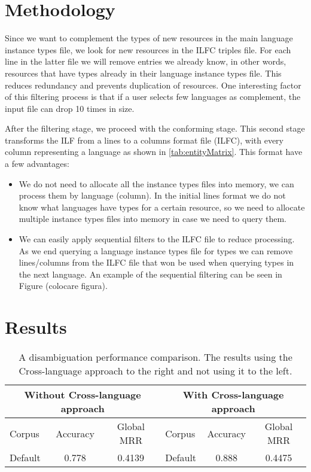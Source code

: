 \documentclass[10pt,a4paper]{llncs}
\begin{document}
\section{Methodology}

Since we want to complement the types of new resources in the main language instance types file, we look for new resources in the ILFC triples file. For each line in the latter file we will remove entries we already know, in other words, resources that have types already in their language instance types file. This reduces redundancy and prevents duplication of resources. One interesting factor of this filtering process is that if a user selects few languages as complement, the input file can drop 10 times in size.

After the filtering stage, we proceed with the conforming stage. This second stage transforms the ILF from a lines to a columns format file (ILFC), with every column representing a language as shown in \ref{tab:entityMatrix}. This format have a few advantages:

\begin{itemize}
	\item We do not need to allocate all the instance types files into memory, we can process them by language (column). In the initial lines format we do not know what languages have types for a certain resource, so we need to allocate multiple instance types files into memory in case we need to query them.
	\item We can easily apply sequential filters to the ILFC file to reduce processing. As we end querying a language instance types file for types we can remove lines/columns from the ILFC file that won be used when querying types in the next language. An example of the sequential filtering can be seen in Figure (colocare figura).
\end{itemize}

\section{Results}

\begin{table}
\centering
    \begin{tabular}{|l|c|c|l|c|c|}
		\hline
		\multicolumn{3}{|c|}{Without Cross-language approach} & \multicolumn{3}{|c|}{With Cross-language approach}   \\ \hline		
    Corpus       & Accuracy     & Global MRR & Corpus       & Accuracy     & Global MRR                \\ \hline
    Default      & 0.778        & 0.4139     & Default      & 0.888        & 0.4475                    \\		
		\hline   		
    \end{tabular}
		\vspace{0.2cm}
    \caption{A disambiguation performance comparison. The results using the Cross-language approach to the right and not using it to the left.}
	  \label{tab:resultsTable}
\end{table}
\end{document}
